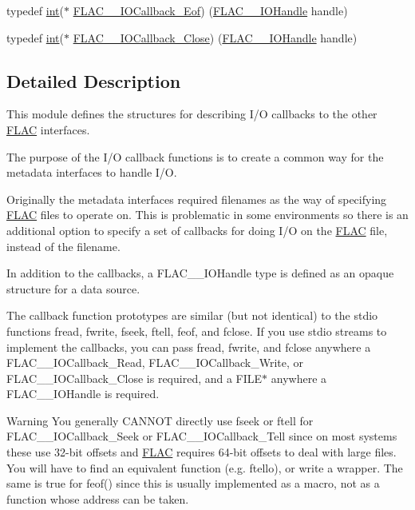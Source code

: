\begin{DoxyCompactItemize}
\item 
typedef \hyperlink{xmltok_8h_a5a0d4a5641ce434f1d23533f2b2e6653}{int}($\ast$ \hyperlink{group__flac__callbacks_ga00ae3b3d373e691908e9539ebf720675}{F\+L\+A\+C\+\_\+\+\_\+\+I\+O\+Callback\+\_\+\+Eof}) (\hyperlink{group__flac__callbacks_ga4c329c3168dee6e352384c5e9306260d}{F\+L\+A\+C\+\_\+\+\_\+\+I\+O\+Handle} handle)
\item 
typedef \hyperlink{xmltok_8h_a5a0d4a5641ce434f1d23533f2b2e6653}{int}($\ast$ \hyperlink{group__flac__callbacks_ga0032267fac38220689778833e08f7387}{F\+L\+A\+C\+\_\+\+\_\+\+I\+O\+Callback\+\_\+\+Close}) (\hyperlink{group__flac__callbacks_ga4c329c3168dee6e352384c5e9306260d}{F\+L\+A\+C\+\_\+\+\_\+\+I\+O\+Handle} handle)
\end{DoxyCompactItemize}


\subsection{Detailed Description}
This module defines the structures for describing I/O callbacks to the other \hyperlink{namespace_f_l_a_c}{F\+L\+AC} interfaces. 

The purpose of the I/O callback functions is to create a common way for the metadata interfaces to handle I/O.

Originally the metadata interfaces required filenames as the way of specifying \hyperlink{namespace_f_l_a_c}{F\+L\+AC} files to operate on. This is problematic in some environments so there is an additional option to specify a set of callbacks for doing I/O on the \hyperlink{namespace_f_l_a_c}{F\+L\+AC} file, instead of the filename.

In addition to the callbacks, a F\+L\+A\+C\+\_\+\+\_\+\+I\+O\+Handle type is defined as an opaque structure for a data source.

The callback function prototypes are similar (but not identical) to the stdio functions fread, fwrite, fseek, ftell, feof, and fclose. If you use stdio streams to implement the callbacks, you can pass fread, fwrite, and fclose anywhere a F\+L\+A\+C\+\_\+\+\_\+\+I\+O\+Callback\+\_\+\+Read, F\+L\+A\+C\+\_\+\+\_\+\+I\+O\+Callback\+\_\+\+Write, or F\+L\+A\+C\+\_\+\+\_\+\+I\+O\+Callback\+\_\+\+Close is required, and a F\+I\+L\+E$\ast$ anywhere a F\+L\+A\+C\+\_\+\+\_\+\+I\+O\+Handle is required. \begin{DoxyWarning}{Warning}
You generally C\+A\+N\+N\+OT directly use fseek or ftell for F\+L\+A\+C\+\_\+\+\_\+\+I\+O\+Callback\+\_\+\+Seek or F\+L\+A\+C\+\_\+\+\_\+\+I\+O\+Callback\+\_\+\+Tell since on most systems these use 32-\/bit offsets and \hyperlink{namespace_f_l_a_c}{F\+L\+AC} requires 64-\/bit offsets to deal with large files. You will have to find an equivalent function (e.\+g. ftello), or write a wrapper. The same is true for feof() since this is usually implemented as a macro, not as a function whose address can be taken. 
\end{DoxyWarning}


